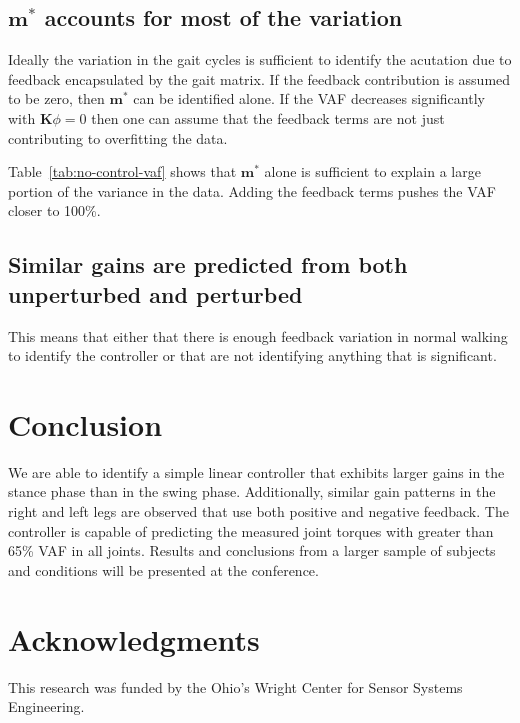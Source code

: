 \documentclass{article}
\begin{document}
\subsection*{$\mathbf{m}^*$ accounts for most of the variation}
%
Ideally the variation in the gait cycles is sufficient to identify the
acutation due to feedback encapsulated by the gait matrix. If the feedback
contribution is assumed to be zero, then $\mathbf{m}^*$ can be identified
alone. If the VAF decreases significantly with $\mathbf{K}{\phi}=0$ then one
can assume that the feedback terms are not just contributing to overfitting the
data.
%
\begin{table}
  \cprotect\caption{Generated by \verb|src/table_no_control_vaf_comparison.py|.}
  \centering
  
  \label{tab:no-control-vaf}
\end{table}

Table~\ref{tab:no-control-vaf} shows that $\mathbf{m}^*$ alone is sufficient to
explain a large portion of the variance in the data. Adding the feedback terms
pushes the VAF closer to 100\%.

\subsection*{Similar gains are predicted from both unperturbed and perturbed}
%
This means that either that there is enough feedback variation in normal
walking to identify the controller or that are not identifying anything that is
significant.

\section*{Conclusion}
%
We are able to identify a simple linear controller that exhibits larger gains
in the stance phase than in the swing phase. Additionally, similar gain
patterns in the right and left legs are observed that use both positive and
negative feedback. The controller is capable of predicting the measured joint
torques with greater than 65\% VAF in all joints. Results and conclusions from
a larger sample of subjects and conditions will be presented at the conference.

\section*{Acknowledgments}

This research was funded by the Ohio's Wright Center for Sensor Systems
Engineering.



\end{document}
